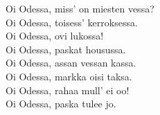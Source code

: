 
            Oi Odessa, miss' on miesten vessa? \\
            Oi Odessa, toisess’ kerroksessa. \\
            Oi Odessa, ovi lukossa! \\
            Oi Odessa, paskat housussa. \\
            Oi Odessa, assan vessan kassa. \\
            Oi Odessa, markka oisi taksa. \\
            Oi Odessa, rahaa mull' ei oo! \\
            Oi Odessa, paska tulee jo. \\
